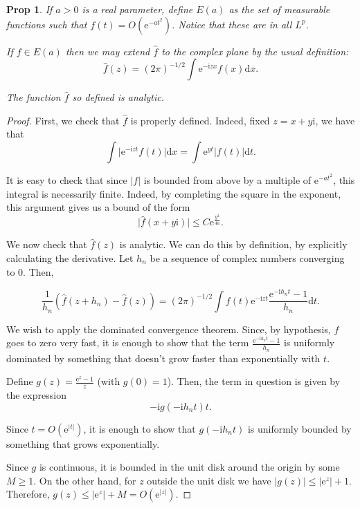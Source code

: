 \documentclass{amsart}
\newcommand{\dd}{\mathrm{d}}
\newcommand{\e}{\mathrm{e}}
\newcommand{\I}{\mathrm{i}}
\newtheorem{prop}{Prop}
\begin{document}
\begin{prop}\label{complexfourier}
If $a > 0$ is a real parameter, define $E(a)$ as the set of measurable functions such that $f(t) = O(\e^{- a t^2})$. Notice that these are in all $L^p$.

If $f \in E(a)$ then we may extend $\hat f$ to the complex plane by the usual definition:
\[\hat f(z) = (2 \pi)^{-1/2} \int \e^{- \I z x} f(x) \dd x.\]

The function $\hat f$ so defined is analytic.
\end{prop}

\begin{proof}
First, we check that $\hat f$ is properly defined. Indeed, fixed $z = x + y\I$, we have that
\[\int \lvert \e^{- \I z t} f(t) \rvert \dd x = \int \e^{y t} \lvert f(t) \rvert \dd t.\]

It is easy to check that since $\lvert f \rvert$ is bounded from above by a multiple of $\e^{- a t^2}$, this integral is necessarily finite. Indeed, by completing the square in the exponent, this argument gives us a bound of the form
\begin{equation}\label{bound1}
\lvert \hat f(x+y\I) \rvert \leq C \e^{\frac{y^2}{4a}}.
\end{equation}

We now check that $\hat f(z)$ is analytic. We can do this by definition, by explicitly calculating the derivative. Let $h_n$ be a sequence of complex numbers converging to 0. Then,

\begin{equation}\label{eq2}
\frac1{h_n}(\hat f(z+h_n) - \hat f(z)) = (2 \pi)^{-1/2} \int f(t) \e^{- \I z t} \frac{\e^{-\I h_n t} - 1}{h_n} \dd t.
\end{equation}

We wish to apply the dominated convergence theorem. Since, by hypothesis, $f$ goes to zero very fast, it is enough to show that the term $\frac{\e^{-\I h_n t} - 1}{h_n}$ is uniformly dominated by something that doesn't grow faster than exponentially with $t$.

Define $g(z) = \frac{\e^z - 1}z$ (with $g(0) = 1$). Then, the term in question is given by the expression
\[-\I g(-\I h_n t) t.\]

Since $t = O(\e^{\lvert t \rvert})$, it is enough to show that $g(-\I h_n t)$ is uniformly bounded by something that grows exponentially.

Since $g$ is continuous, it is bounded in the unit disk around the origin by some $M \geq 1$. On the other hand, for $z$ outside the unit disk we have $\lvert g(z) \rvert \leq \lvert \e^z \rvert + 1$. Therefore, $g(z) \leq \lvert \e^z \rvert + M = O(\e^{\lvert z \rvert})$.


\end{proof}
\end{document}

